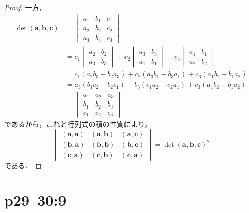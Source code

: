 \documentclass[a4paper,10pt,fleqn]{ltjsarticle}
\begin{document}
\begin{tleftbar}
\begin{proof}
    一方，
    \begin{align*}
      \det (\bm{a},\bm{b},\bm{c}) & =
      \begin{vmatrix}
        a_1 & b_1 & c_1 \\
        a_2 & b_2 & c_2 \\
        a_3 & b_3 & c_3
      \end{vmatrix}                                                                                        \\
                                  & = c_1
      \begin{vmatrix}
        a_2 & b_2 \\
        a_3 & b_3
      \end{vmatrix}
      + c_2
      \begin{vmatrix}
        a_3 & b_3 \\
        a_1 & b_1
      \end{vmatrix}
      + c_3
      \begin{vmatrix}
        a_1 & b_1 \\
        a_2 & b_2
      \end{vmatrix}
      \\
                                  & = c_1 (a_2 b_3-b_2 a_3)+c_2 (a_3 b_1 - b_3 a_1)+c_3 (a_1 b_2 -b_1 a_2)   \\
                                  & = a_3 (b_1 c_2 - b_2 c_1)+b_3 (c_1 a_2-c_2 a_1)+ c_3 (a_1 b_2 - b_1 a_2) \\
                                  & =
      \begin{vmatrix}
        a_1 & a_2 & a_3 \\
        b_1 & b_2 & b_3 \\
        c_1 & c_2 & c_3
      \end{vmatrix}
    \end{align*}
    であるから，これと行列式の積の性質により，
    \[
      \begin{vmatrix}
        (\bm{a},\bm{a}) & (\bm{a},\bm{b}) & (\bm{a},\bm{c}) \\
        (\bm{b},\bm{a}) & (\bm{b},\bm{b}) & (\bm{b},\bm{c}) \\
        (\bm{c},\bm{a}) & (\bm{c},\bm{b}) & (\bm{c},\bm{a})
      \end{vmatrix}
      = {\det (\bm{a},\bm{b},\bm{c})}^2
    \]
    である．
  \end{proof}
\end{tleftbar}


\section*{p29--30:9}
\end{document}
